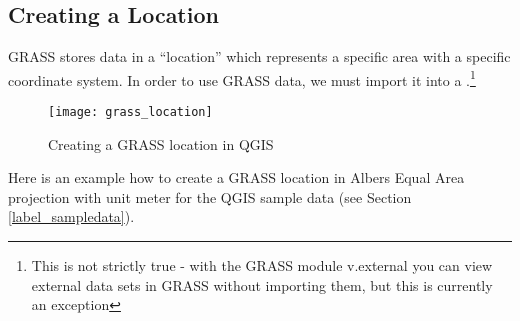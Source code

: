 \subsection{Creating a Location}\label{sec:create_loc}

GRASS stores data in a ``location'' which represents a specific area with a 
specific coordinate system. In order to use GRASS data, we must import it 
into a .\footnote{This is not strictly true - with the
GRASS module v.external you can view external data sets in GRASS without 
importing them, but this is currently an exception}

\begin{figure}[ht]
   \begin{center}
   \caption{Creating a GRASS location in QGIS}\label{fig:grass_location}\smallskip
   \texttt{[image: grass\_location]}
\end{center}  
\end{figure}

Here is an example how to create a GRASS location in Albers Equal Area 
projection with unit meter for the QGIS sample data (see Section \ref{label_sampledata}). 

